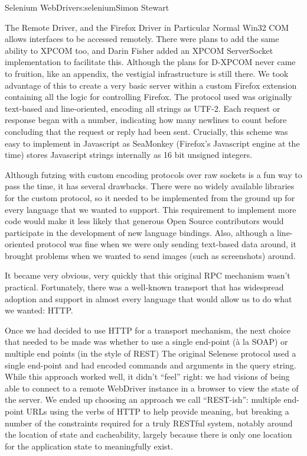 \begin{aosachapter}{Selenium WebDriver}{s:selenium}{Simon Stewart}
\begin{aosasect1}{The Remote Driver, and the Firefox Driver in Particular}
Normal Win32 COM allows interfaces to be accessed remotely. There were
plans to add the same ability to XPCOM too, and Darin Fisher added an
XPCOM ServerSocket implementation to facilitate this. Although the
plans for D-XPCOM never came to fruition, like an appendix, the
vestigial infrastructure is still there.  We took advantage of this to
create a very basic server within a custom Firefox extension
containing all the logic for controlling Firefox. The protocol used
was originally text-based and line-oriented, encoding all strings as
UTF-2. Each request or response began with a number, indicating how
many newlines to count before concluding that the request or reply had
been sent. Crucially, this scheme was easy to implement in Javascript
as SeaMonkey (Firefox's Javascript engine at the time) stores
Javascript strings internally as 16 bit unsigned integers.

Although futzing with custom encoding protocols over raw sockets is a
fun way to pass the time, it has several drawbacks. There were no
widely available libraries for the custom protocol, so it needed to be
implemented from the ground up for every language that we wanted to
support. This requirement to implement more code would make it less
likely that generous Open Source contributors would participate in the
development of new language bindings. Also, although a line-oriented
protocol was fine when we were only sending text-based data around, it
brought problems when we wanted to send images (such as screenshots)
around.

It became very obvious, very quickly that this original RPC mechanism
wasn't practical. Fortunately, there was a well-known transport that
has widespread adoption and support in almost every language that
would allow us to do what we wanted: HTTP.

Once we had decided to use HTTP for a transport mechanism, the next
choice that needed to be made was whether to use a single end-point
(\`{a} la SOAP) or multiple end points (in the style of REST) The
original Selenese protocol used a single end-point and had encoded
commands and arguments in the query string. While this approach worked
well, it didn't ``feel'' right: we had visions of being able to
connect to a remote WebDriver instance in a browser to view the state
of the server. We ended up choosing an approach we call ``REST-ish'':
multiple end-point URLs using the verbs of HTTP to help provide
meaning, but breaking a number of the constraints required for a truly
RESTful system, notably around the location of state and cacheability,
largely because there is only one location for the application state
to meaningfully exist.


\end{aosasect1}
\end{aosachapter}
